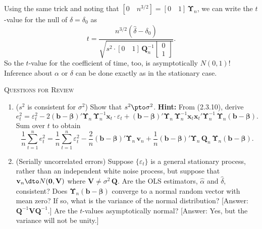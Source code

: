 Using the same trick and noting that
$[0 \quad n^{3/2}] = [0 \quad 1]\,\bm{\Upsilon}_n$, we can write the
$t$-value for the null of $\delta = \delta_0$ as
%
\begin{equation}
t = \frac{n^{3/2}(\hat{\delta} - \delta_0)}
{\sqrt{s^2 \cdot [0 \quad 1]\,\mathbf{Q}_n^{-1}
\begin{bmatrix} 0 \\ 1 \end{bmatrix}}}.
\label{eq:2.12.15}
\end{equation}
%
So the $t$-value for the coefficient of time, too, is asymptotically $N(0, 1)$! Inference
about $\alpha$ or $\delta$ can be done exactly as in the stationary case.

\bigskip
\noindent\textsc{Questions for Review}
\begin{enumerate}
\item ($s^2$ is consistent for $\sigma^2$)\quad
Show that $s^2 \pto \sigma^2$. \textbf{Hint:} From (2.3.10), derive
\[
e_t^2 = \varepsilon_t^2
- 2(\mathbf{b} - \bm{\beta})'\bm{\Upsilon}_n\,\bm{\Upsilon}_n^{-1}\mathbf{x}_t
\cdot \varepsilon_t
+ (\mathbf{b} - \bm{\beta})'\bm{\Upsilon}_n\,
\bm{\Upsilon}_n^{-1}\mathbf{x}_t\mathbf{x}_t'\bm{\Upsilon}_n^{-1}\,
\bm{\Upsilon}_n(\mathbf{b} - \bm{\beta}).
\]
Sum over $t$ to obtain
\[
\frac{1}{n}\sum_{t=1}^{n}e_t^2
= \frac{1}{n}\sum_{t=1}^{n}\varepsilon_t^2
- \frac{2}{n}(\mathbf{b} - \bm{\beta})'\bm{\Upsilon}_n\,\mathbf{v}_n
+ \frac{1}{n}(\mathbf{b} - \bm{\beta})'\bm{\Upsilon}_n\,
\mathbf{Q}_n\,\bm{\Upsilon}_n(\mathbf{b} - \bm{\beta}).
\]

\item (Serially uncorrelated errors)\quad
Suppose $\{\varepsilon_t\}$ is a general stationary process,
rather than an independent white noise process, but suppose that
$\mathbf{v}_n \dto N(\mathbf{0}, \mathbf{V})$
where $\mathbf{V} \neq \sigma^2\,\mathbf{Q}$. Are the OLS estimators, $\hat{\alpha}$ and $\hat{\delta}$, consistent? Does
$\bm{\Upsilon}_n(\mathbf{b} - \bm{\beta})$ converge to a normal random vector with mean zero? If so,
what is the variance of the normal distribution?
[Answer: $\mathbf{Q}^{-1}\mathbf{V}\mathbf{Q}^{-1}$.]
Are the $t$-values asymptotically normal?
[Answer: Yes, but the variance will not be unity.]
\end{enumerate}
